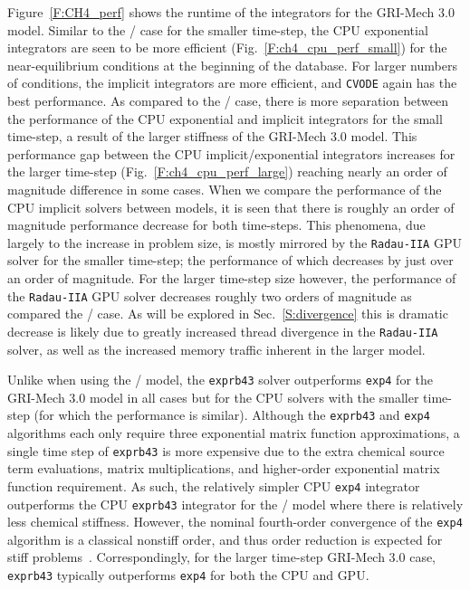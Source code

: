 \documentclass[final,twocolumn]{elsarticle}
\begin{document}
Figure~\ref{F:CH4_perf} shows the runtime of the integrators for the GRI-Mech 3.0 model.
Similar to the \slash{} case for the smaller time-step, the CPU exponential integrators are seen to be more efficient (Fig.~\ref{F:ch4_cpu_perf_small}) for the near-equilibrium conditions at the beginning of the database.
For larger numbers of conditions, the implicit integrators are more efficient, and \texttt{CVODE} again has the best performance.
As compared to the \slash{} case, there is more separation between the performance of the CPU exponential and implicit integrators for the small time-step, a result of the larger stiffness of the GRI-Mech 3.0 model.
This performance gap between the CPU implicit\slash exponential integrators increases for the larger time-step (Fig.~\ref{F:ch4_cpu_perf_large}) reaching nearly an order of magnitude difference in some cases.
When we compare the performance of the CPU implicit solvers between models, it is seen that there is roughly an order of magnitude performance decrease for both time-steps.
This phenomena, due largely to the increase in problem size, is mostly mirrored by the \texttt{Radau-IIA} GPU solver for the smaller time-step; the performance of which decreases by just over an order of magnitude.
For the larger time-step size however, the performance of the \texttt{Radau-IIA} GPU solver decreases roughly two orders of magnitude as compared the \slash{} case.
As will be explored in Sec.~\ref{S:divergence} this is dramatic decrease is likely due to greatly increased thread divergence in the \texttt{Radau-IIA} solver, as well as the increased memory traffic inherent in the larger model.

Unlike when using the \slash{} model, the \texttt{exprb43} solver outperforms \texttt{exp4} for the GRI-Mech 3.0 model in all cases but for the CPU solvers with the smaller time-step (for which the performance is similar).
Although the \texttt{exprb43} and \texttt{exp4} algorithms each only require three exponential matrix function approximations, a single time step of \texttt{exprb43} is more expensive due to the extra chemical source term evaluations, matrix multiplications, and higher-order exponential matrix function requirement.
As such, the relatively simpler CPU \texttt{exp4} integrator outperforms the CPU \texttt{exprb43} integrator for the \slash{} model where there is relatively less chemical stiffness.
However, the nominal fourth-order convergence of the \texttt{exp4} algorithm is a classical nonstiff order, and thus order reduction is expected for stiff problems~\cite{ANU:7701740,Bisetti:2012jw}.
Correspondingly, for the larger time-step GRI-Mech 3.0 case, \texttt{exprb43} typically outperforms \texttt{exp4} for both the CPU and GPU.
\end{document}
